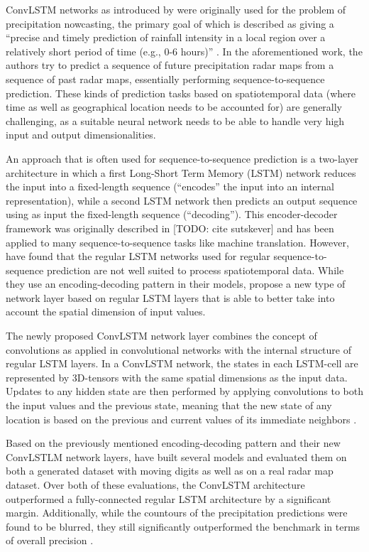 ConvLSTM networks as introduced by \citet{Shi.2015} were originally used for the problem of precipitation nowcasting, the primary goal of which is described as giving a ``precise and timely prediction of rainfall intensity in a local region over a relatively short period of time (e.g., 0-6 hours)'' \citep{Shi.2015}. In the aforementioned work, the authors try to predict a sequence of future precipitation radar maps from a sequence of past radar maps, essentially performing sequence-to-sequence prediction. These kinds of prediction tasks based on spatiotemporal data (where time as well as geographical location needs to be accounted for) are generally challenging, as a suitable neural network needs to be able to handle very high input and output dimensionalities.

An approach that is often used for sequence-to-sequence prediction is a two-layer architecture in which a first Long-Short Term Memory (LSTM) network reduces the input into a fixed-length sequence (``encodes'' the input into an internal representation), while a second LSTM network then predicts an output sequence using as input the fixed-length sequence (``decoding''). This encoder-decoder framework was originally described in [TODO: cite sutskever] and has been applied to many sequence-to-sequence tasks like machine translation. However, \citet{Shi.2015} have found that the regular LSTM networks used for regular sequence-to-sequence prediction are not well suited to process spatiotemporal data. While they use an encoding-decoding pattern in their models, \citet{Shi.2015} propose a new type of network layer based on regular LSTM layers that is able to better take into account the spatial dimension of input values.

The newly proposed ConvLSTM network layer combines the concept of convolutions as applied in convolutional networks with the internal structure of regular LSTM layers. In a ConvLSTM network, the states in each LSTM-cell are represented by 3D-tensors with the same spatial dimensions as the input data. Updates to any hidden state are then performed by applying convolutions to both the input values and the previous state, meaning that the new state of any location is based on the previous and current values of its immediate neighbors \citep{Shi.2015}.

Based on the previously mentioned encoding-decoding pattern and their new ConvLSTLM network layers, \citet{Shi.2015} have built several models and evaluated them on both a generated dataset with moving digits as well as on a real radar map dataset. Over both of these evaluations, the ConvLSTM architecture outperformed a fully-connected regular LSTM architecture by a significant margin. Additionally, while the countours of the precipitation predictions were found to be blurred, they still significantly outperformed the benchmark in terms of overall precision \citep{Shi.2015}.

